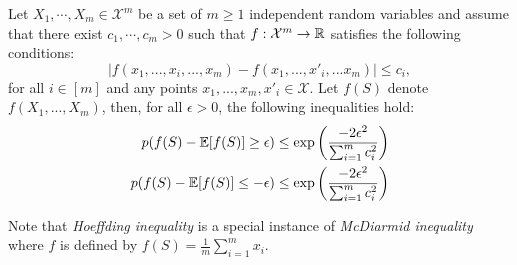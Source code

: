 \begin{theorem}
Let $X_1, \cdots , X_m \in \mathcal{X}^m$ be a set of $m \geq 1$ independent random variables and assume that there exist $c_1 , \cdots , c_m > 0$ such that $f : \mathcal{X}^m \rightarrow \mathbb{R}$ satisfies the following conditions:	
$$|f(x_1,...,x_i,...,x_m) - f(x_1,...,x'_i,...x_m)|\leq c_i, $$
for all $i \in [m]$ and any points $x_1,...,x_m, x'_i \in \mathcal{X}$. Let $f(S)$ denote $f(X_1,...,X_m)$, then, for all $\epsilon > 0$, the following inequalities hold:
\begin{align}
	p(f(S) - \mathbb{E}[f(S)] \geq \epsilon) \leq \exp\left( \frac{-2\epsilon^2}{\sum_{i=1}^m c_i^2} \right) \\
	p(f(S) - \mathbb{E}[f(S)] \leq -\epsilon) \leq \exp\left( \frac{-2\epsilon^2}{\sum_{i=1}^m  c_i^2} \right) 
\end{align}
\end{theorem}
Note that \textit{Hoeffding inequality} is a special instance of \textit{McDiarmid inequality} where $f$ is defined by $f(S) = \frac{1}{m}\sum_{i=1}^m x_i$.
                                                                                                                                                                                                                                                                                                                                                                                                                                                                                                                                  
                                                                                                                                                                                                                                                                                                                                                                                                                                                                                                                                                                                                                                                                                                                                                                                                                                                                                                                                                                                                                                                                                                                                                                                                                                                                                                                                                                                    